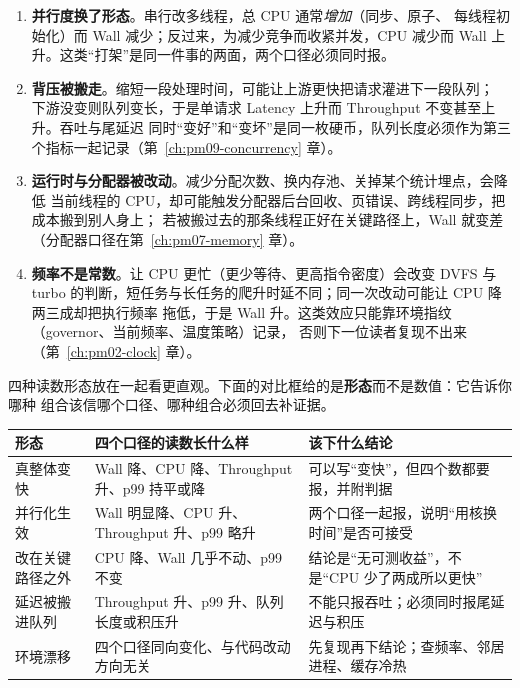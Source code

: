 \documentclass[12pt,a4paper,fontset=fandol]{ctexbook}
\newcommand{\Lang}[1]{\textsf{#1}}
\newcommand{\MWall}{\Lang{Wall}}
\newcommand{\MCpu}{\Lang{CPU}}
\newcommand{\MLat}{\Lang{Latency}}
\newcommand{\MThr}{\Lang{Throughput}}
\newcommand{\Mx}[1]{\textsf{#1}}
\begin{document}
\begin{enumerate}
  \item \textbf{并行度换了形态}。串行改多线程，总 \MCpu{} 通常\emph{增加}（同步、原子、
    每线程初始化）而 \MWall{} 减少；反过来，为减少竞争而收紧并发，\MCpu{} 减少而
    \MWall{} 上升。这类``打架''是同一件事的两面，两个口径必须同时报。
  \item \textbf{背压被搬走}。缩短一段处理时间，可能让上游更快把请求灌进下一段队列；
    下游没变则队列变长，于是单请求 \MLat{} 上升而 \MThr{} 不变甚至上升。吞吐与尾延迟
    同时``变好''和``变坏''是同一枚硬币，队列长度必须作为第三个指标一起记录（第~\ref{ch:pm09-concurrency} 章）。
  \item \textbf{运行时与分配器被改动}。减少分配次数、换内存池、关掉某个统计埋点，会降低
    当前线程的 \MCpu，却可能触发分配器后台回收、页错误、跨线程同步，把成本搬到别人身上；
    若被搬过去的那条线程正好在关键路径上，\MWall{} 就变差（分配器口径在第~\ref{ch:pm07-memory} 章）。
  \item \textbf{频率不是常数}。让 CPU 更忙（更少等待、更高指令密度）会改变 DVFS 与 turbo
    的判断，短任务与长任务的爬升时延不同；同一次改动可能让 \MCpu{} 降两三成却把执行频率
    拖低，于是 \MWall{} 升。这类效应只能靠环境指纹（governor、当前频率、温度策略）记录，
    否则下一位读者复现不出来（第~\ref{ch:pm02-clock} 章）。
\end{enumerate}

四种读数形态放在一起看更直观。下面的对比框给的是\textbf{形态}而不是数值：它告诉你哪种
组合该信哪个口径、哪种组合必须回去补证据。

\begin{compare}[title={四个口径同时变化时的五种典型形态}]
\small
\begin{tabular}{>{\raggedright\arraybackslash}p{}
                >{\raggedright\arraybackslash}p{}
                >{\raggedright\arraybackslash}p{}}
\toprule
\textbf{形态} & \textbf{四个口径的读数长什么样} & \textbf{该下什么结论}\\
\midrule
真整体变快 &
\MWall{} 降、\MCpu{} 降、\MThr{} 升、\Mx{p99} 持平或降 &
可以写``变快''，但四个数都要报，并附判据\\
并行化生效 &
\MWall{} 明显降、\MCpu{} 升、\MThr{} 升、\Mx{p99} 略升 &
两个口径一起报，说明``用核换时间''是否可接受\\
改在关键路径之外 &
\MCpu{} 降、\MWall{} 几乎不动、\Mx{p99} 不变 &
结论是``无可测收益''，不是``CPU 少了两成所以更快''\\
延迟被搬进队列 &
\MThr{} 升、\Mx{p99} 升、队列长度或积压升 &
不能只报吞吐；必须同时报尾延迟与积压\\
环境漂移 &
四个口径同向变化、与代码改动方向无关 &
先复现再下结论；查频率、邻居进程、缓存冷热\\
\bottomrule
\end{tabular}
\end{compare}
\end{document}
